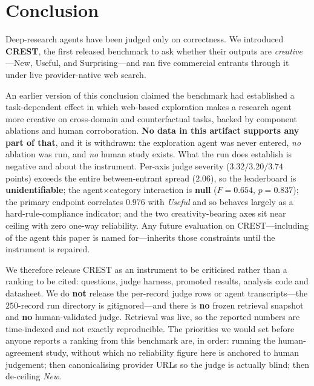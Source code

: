 \section{Conclusion}
\label{sec:conclusion}

Deep-research agents have been judged only on correctness. We introduced \textbf{CREST}, the first
released benchmark to ask whether their outputs are \emph{creative}---New, Useful, and
Surprising---and ran five commercial entrants through it under live provider-native web search.

An earlier version of this conclusion claimed the benchmark had established a task-dependent effect
in which web-based exploration makes a research agent more creative on cross-domain and
counterfactual tasks, backed by component ablations and human corroboration. \textbf{No data in this
artifact supports any part of that}, and it is withdrawn: the exploration agent was never entered,
\emph{no} ablation was run, and \emph{no} human study exists. What the run does establish is negative and
about the instrument. Per-axis judge severity ($3.32/3.20/3.74$ points) exceeds the entire
between-entrant spread ($2.06$), so the leaderboard is \textbf{unidentifiable}; the
agent$\times$category interaction is \textbf{null} ($F=0.654$, $p=0.837$); the primary endpoint
correlates $0.976$ with \emph{Useful} and so behaves largely as a hard-rule-compliance indicator;
and the two creativity-bearing axes sit near ceiling with zero one-way reliability. Any future
evaluation on CREST---including of the agent this paper is named for---inherits those constraints
until the instrument is repaired.

We therefore release CREST as an instrument to be criticised rather than a ranking to be cited:
questions, judge harness, promoted results, analysis code and datasheet. We do \textbf{not} release the
per-record judge rows or agent transcripts---the $250$-record run directory is gitignored---and there is
\textbf{no} frozen retrieval snapshot and \textbf{no} human-validated judge. Retrieval was live, so the
reported numbers are time-indexed and not exactly reproducible. The priorities we would set before
anyone reports a ranking from this benchmark are, in order: running the human-agreement study, without
which no reliability figure here is anchored to human judgement; then canonicalising provider URLs so
the judge is actually blind; then de-ceiling \emph{New}.

